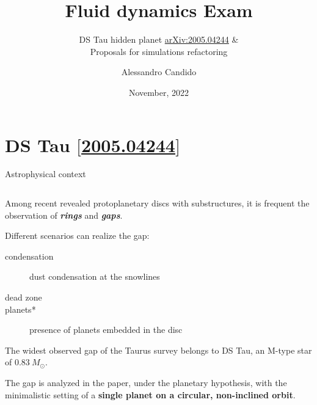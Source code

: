 \documentclass[9pt]{beamer}
\title{Fluid dynamics Exam}
\subtitle{
    DS Tau hidden planet \href{https://arxiv.org/abs/2005.04244}{arXiv:2005.04244} \&\\
    Proposals for simulations refactoring
}
\date{November, 2022}
\author{Alessandro Candido}
\providecommand{\iRef}[1]{{\color{mLightGreen}\small $[$#1$]$}}
\begin{document}
\maketitle


\section{DS Tau \iRef{\href{https://arxiv.org/abs/2005.04244}{2005.04244}}}

\begin{frame}{Astrophysical context}
    \begin{columns}
        \begin{column}{0.5\textwidth}
            \vspace*{15pt}

            Among recent revealed protoplanetary discs with substructures, it
            is frequent the observation of \textit{\textbf{rings}} and
            \textit{\textbf{gaps}}.
            \vspace*{10pt}

            Different scenarios can realize the gap:
            \begin{description}
                \item[condensation] dust condensation at the snowlines
                \item[dead zone]
                \item[planets*] presence of planets embedded in the disc
            \end{description}
            \vspace*{10pt}

            The widest observed gap of the Taurus survey belongs to DS Tau, an
            M-type star of $0.83~M_\odot$.

            The gap is analyzed in the paper, under the planetary hypothesis,
            with the minimalistic setting of a \textbf{single planet on a
            circular, non-inclined orbit}.
            \vspace*{10pt}


\end{column}
\end{columns}
\end{frame}
\end{document}
